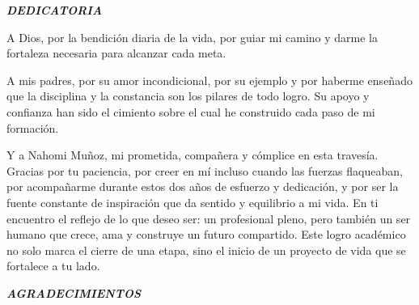 \documentclass[12pt,letterpaper,oneside]{report}
\begin{document}
\newpage
\thispagestyle{empty}

\begin{center}
{\fontsize{14}{16}\selectfont\bfseries\itshape DEDICATORIA}\\[0.5cm]
\end{center}

\begin{flushleft}
\singlespacing
\justifying
{\itshape\fontsize{12}{14}\selectfont 

A Dios, por la bendición diaria de la vida, por guiar mi camino y darme la fortaleza necesaria para alcanzar cada meta.

A mis padres, por su amor incondicional, por su ejemplo y por haberme enseñado que la disciplina y la constancia son los pilares de todo logro. Su apoyo y confianza han sido el cimiento sobre el cual he construido cada paso de mi formación.

Y a Nahomi Muñoz, mi prometida, compañera y cómplice en esta travesía. Gracias por tu paciencia, por creer en mí incluso cuando las fuerzas flaqueaban, por acompañarme durante estos dos años de esfuerzo y dedicación, y por ser la fuente constante de inspiración que da sentido y equilibrio a mi vida. En ti encuentro el reflejo de lo que deseo ser: un profesional pleno, pero también un ser humano que crece, ama y construye un futuro compartido. Este logro académico no solo marca el cierre de una etapa, sino el inicio de un proyecto de vida que se fortalece a tu lado.

}
\end{flushleft}

\begin{center}
{\fontsize{14}{16}\selectfont\bfseries\itshape AGRADECIMIENTOS}\\[0.5cm]
\end{center}
\end{document}

